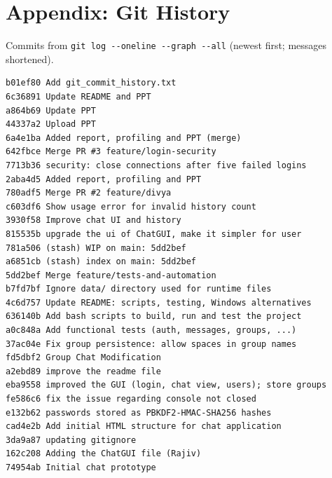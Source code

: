 \documentclass[conference]{IEEEtran}
\newcommand{\code}[1]{\texttt{#1}}
\begin{document}
\section*{Appendix: Git History}
Commits from \code{git log -{}-oneline -{}-graph -{}-all} (newest first; messages shortened).
\begin{lstlisting}[basicstyle=\ttfamily\fontsize{6.8}{7.8}\selectfont, language={}, breaklines=false, frame=none]
b01ef80 Add git_commit_history.txt
6c36891 Update README and PPT
a864b69 Update PPT
44337a2 Upload PPT
6a4e1ba Added report, profiling and PPT (merge)
642fbce Merge PR #3 feature/login-security
7713b36 security: close connections after five failed logins
2aba4d5 Added report, profiling and PPT
780adf5 Merge PR #2 feature/divya
c603df6 Show usage error for invalid history count
3930f58 Improve chat UI and history
815535b upgrade the ui of ChatGUI, make it simpler for user
781a506 (stash) WIP on main: 5dd2bef
a6851cb (stash) index on main: 5dd2bef
5dd2bef Merge feature/tests-and-automation
b7fd7bf Ignore data/ directory used for runtime files
4c6d757 Update README: scripts, testing, Windows alternatives
636140b Add bash scripts to build, run and test the project
a0c848a Add functional tests (auth, messages, groups, ...)
37ac04e Fix group persistence: allow spaces in group names
fd5dbf2 Group Chat Modification
a2ebd89 improve the readme file
eba9558 improved the GUI (login, chat view, users); store groups
fe586c6 fix the issue regarding console not closed
e132b62 passwords stored as PBKDF2-HMAC-SHA256 hashes
cad4e2b Add initial HTML structure for chat application
3da9a87 updating gitignore
162c208 Adding the ChatGUI file (Rajiv)
74954ab Initial chat prototype
\end{lstlisting}
\end{document}
